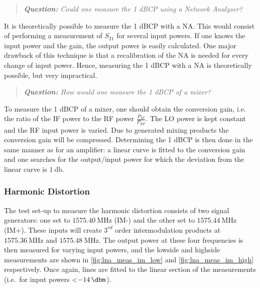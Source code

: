 \documentclass[a4paper]{article}        %
\begin{document}
  \begin{quote} \textit{\textbf{Question:} Could one measure the 1 dBCP using a Network Analyzer?} \end{quote}

    It is theoretically possible to measure the 1 dBCP with a NA. This would consist of performing a measurement of $S_{21}$ for several input powers. If one knows the input power and the gain, the output power is easily calculated. One major drawback of this technique is that a recalibration of the NA is needed for every change of input power. Hence, measuring the 1 dBCP with a NA is theoretically possible, but very impractical. 

  \begin{quote} \textit{\textbf{Question:} How would one measure the 1 dBCP of a mixer?} \end{quote}

  To measure the 1 dBCP of a mixer, one should obtain the conversion gain, i.e. the ratio of the IF power to the RF power $\frac{P_{IF}}{P_{RF}}$. The LO power is kept constant and the RF input power is varied. Due to generated mixing products the conversion gain will be compressed. Determining the 1 dBCP is then done in the same manner as for an amplifier: a linear curve is fitted to the conversion gain and one searches for the output/input power for which the deviation from the linear curve is $\SI{1}{\decibel}$. 


  \subsubsection{Harmonic Distortion}
  The test set-up to measure the harmonic distortion consists of two signal generators: one set to $\SI{1575.40}{\mega\hertz}$ (IM-) and the other set to $\SI{1575.44}{\mega\hertz}$ (IM+).
  These inputs will create $3^{rd}$ order intermodulation products at $\SI{1575.36}{\mega\hertz}$ and $\SI{1575.48}{\mega\hertz}$.
  The output power at these four frequencies is then measured for varying input powers, and the lowside and highside measurements are shown in \autoref{fig:lna_meas_im_low} and \autoref{fig:lna_meas_im_high} respectively.
  Once again, lines are fitted to the linear section of the measurements (i.e.\ for input powers \textless $\SI{-14}{\dbm}$).
\end{document}
